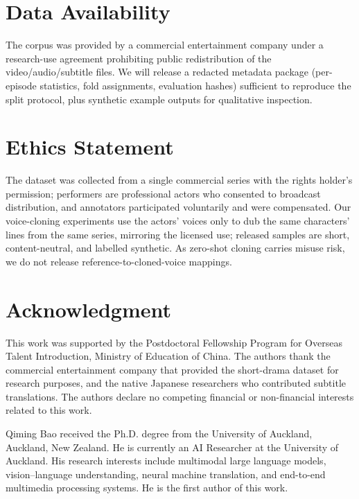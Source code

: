 \documentclass[journal]{IEEEtran}
\begin{document}
\section*{Data Availability}
The corpus was provided by a commercial entertainment company under a research-use agreement prohibiting public redistribution of the video/audio/subtitle files. We will release a redacted metadata package (per-episode statistics, fold assignments, evaluation hashes) sufficient to reproduce the split protocol, plus synthetic example outputs for qualitative inspection.

\section*{Ethics Statement}
The dataset was collected from a single commercial series with the rights holder's permission; performers are professional actors who consented to broadcast distribution, and annotators participated voluntarily and were compensated. Our voice-cloning experiments use the actors' voices only to dub the same characters' lines from the same series, mirroring the licensed use; released samples are short, content-neutral, and labelled synthetic. As zero-shot cloning carries misuse risk, we do not release reference-to-cloned-voice mappings.

\section*{Acknowledgment}
This work was supported by the Postdoctoral Fellowship Program for Overseas Talent Introduction, Ministry of Education of China.
The authors thank the commercial entertainment company that provided the short-drama dataset for research purposes, and the native Japanese researchers who contributed subtitle translations.
The authors declare no competing financial or non-financial interests related to this work.




\iffalse
\pagebreak
\begin{IEEEbiographynophoto}{Qiming Bao}
received the Ph.D. degree from the University of Auckland, Auckland, New Zealand.
He is currently an AI Researcher at the University of Auckland.
His research interests include multimodal large language models, vision--language understanding, neural machine translation, and end-to-end multimedia processing systems.
He is the first author of this work.
\end{IEEEbiographynophoto}
\end{document}
